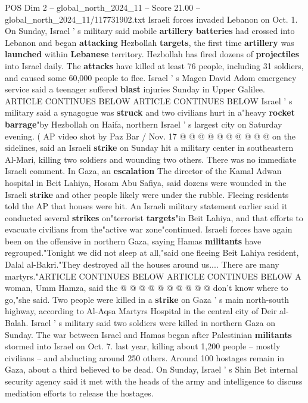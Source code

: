 \begin{textsample}{POS Dim 2 – global\_north\_2024\_11 – Score 21.00 – global\_north\_2024\_11/117731902.txt}
Israeli forces invaded Lebanon on Oct. 1.
On Sunday, Israel ' s military said mobile \textbf{artillery} \textbf{batteries} had crossed into Lebanon and began \textbf{attacking} Hezbollah \textbf{targets}, the first time \textbf{artillery} was \textbf{launched} within \textbf{Lebanese} territory.
Hezbollah has fired dozens of \textbf{projectiles} into Israel daily.
The \textbf{attacks} have killed at least 76 people, including 31 soldiers, and caused some 60,000 people to flee.
Israel ' s Magen David Adom emergency service said a teenager suffered \textbf{blast} injuries Sunday in Upper Galilee.
ARTICLE CONTINUES BELOW ARTICLE CONTINUES BELOW Israel ' s military said a synagogue was \textbf{struck} and two civilians hurt in a"heavy \textbf{rocket} \textbf{barrage}"by Hezbollah on Haifa, northern Israel ' s largest city on Saturday evening. ( AP video shot by Paz Bar / Nov. 17 @ @ @ @ @ @ @ @ @ @ on the sidelines, said an Israeli \textbf{strike} on Sunday hit a military center in southeastern Al-Mari, killing two soldiers and wounding two others.
There was no immediate Israeli comment.
In Gaza, an \textbf{escalation} The director of the Kamal Adwan hospital in Beit Lahiya, Hosam Abu Safiya, said dozens were wounded in the Israeli \textbf{strike} and other people likely were under the rubble.
Fleeing residents told the AP that houses were hit.
An Israeli military statement earlier said it conducted several \textbf{strikes} on"terrorist \textbf{targets}"in Beit Lahiya, and that efforts to evacuate civilians from the"active war zone"continued.
Israeli forces have again been on the offensive in northern Gaza, saying Hamas \textbf{militants} have regrouped."Tonight we did not sleep at all,"said one fleeing Beit Lahiya resident, Dalal al-Bakri."They destroyed all the houses around us....
There are many martyrs."ARTICLE CONTINUES BELOW ARTICLE CONTINUES BELOW A woman, Umm Hamza, said the @ @ @ @ @ @ @ @ @ @ don't know where to go,"she said.
Two people were killed in a \textbf{strike} on Gaza ' s main north-south highway, according to Al-Aqsa Martyrs Hospital in the central city of Deir al-Balah.
Israel ' s military said two soldiers were killed in northern Gaza on Sunday.
The war between Israel and Hamas began after Palestinian \textbf{militants} stormed into Israel on Oct. 7. last year, killing about 1,200 people -- mostly civilians -- and abducting around 250 others.
Around 100 hostages remain in Gaza, about a third believed to be dead.
On Sunday, Israel ' s Shin Bet internal security agency said it met with the heads of the army and intelligence to discuss mediation efforts to release the hostages.

\end{textsample}
